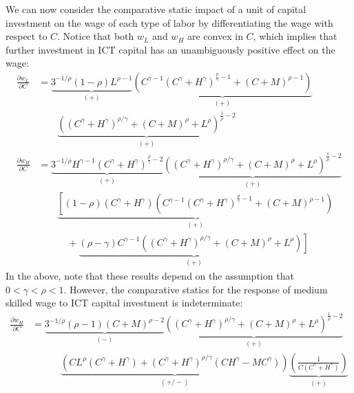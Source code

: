 \documentclass[a4paper]{article}
\begin{document}
We can now consider the comparative static impact of a unit of capital investment on the wage of each type of labor by differentiating the wage with respect to $C$. Notice that both $w_L$ and $w_H$ are convex in $C$, which implies that further investment in ICT capital has an unambiguously positive effect on the wage:
\begin{align*}
\frac{\partial w_L}{\partial C}
  &= \underbrace{3^{-1/\rho } \left(1 - \rho \right) L^{\rho -1}}_{(+)}
\underbrace{\left(C^{\gamma -1} \left(C^{\gamma }+H^{\gamma }\right)^{\frac{\rho }{\gamma }-1}+(C+M)^{\rho -1}\right)}_{(+)}\\
&\quad\quad \underbrace{\left(\left(C^{\gamma }+H^{\gamma }\right)^{\rho /\gamma }+(C+M)^{\rho }+L^{\rho }\right)^{\frac{1}{\rho }-2}}_{(+)} \\
% 
\frac{\partial w_H}{\partial C}
&= \underbrace{3^{-1/\rho } H^{\gamma -1} \left(C^{\gamma }+H^{\gamma }\right)^{\frac{\rho }{\gamma }-2}}_{(+)} 
\underbrace{\left(\left(C^{\gamma }+H^{\gamma }\right)^{\rho /\gamma }+(C+M)^{\rho }+L^{\rho }\right)^{\frac{1}{\rho }-2}}_{(+)} \\
&\quad\quad \underbrace{\left[\left(1-\rho \right) \left(C^{\gamma }+H^{\gamma }\right) \left(C^{\gamma -1} \left(C^{\gamma }+H^{\gamma }\right)^{\frac{\rho }{\gamma }-1}+(C+M)^{\rho -1}\right) \right.}_{(+)}\\
&\quad\quad\quad  + \underbrace{\left.(\rho - \gamma) C^{\gamma -1} \left(\left(C^{\gamma }+H^{\gamma }\right)^{\rho /\gamma }+(C+M)^{\rho }+L^{\rho }\right)\right]}_{(+)}
\end{align*}
In the above, note that these results depend on the assumption that $0 < \gamma < \rho < 1$. However, the comparative statics for the response of medium skilled wage to ICT capital investment is indeterminate:
\begin{align*}
  \frac{\partial w_H}{\partial C}
&= \underbrace{3^{-1/\rho } (\rho -1) (C+M)^{\rho -2}}_{(-)}
\underbrace{\left(\left(C^{\gamma }+H^{\gamma }\right)^{\rho /\gamma }+(C+M)^{\rho }+L^{\rho }\right)^{\frac{1}{\rho }-2}}_{(+)} \\
&\quad\quad\quad\underbrace{\left(C L^{\rho } \left(C^{\gamma }+H^{\gamma }\right)+\left(C^{\gamma }+H^{\gamma }\right)^{\rho /\gamma } \left(C H^{\gamma }-M C^{\gamma }\right)\right)}_{(+/-)}
\underbrace{\left(\frac{1}{C\left(C^{\gamma }+H^{\gamma }\right)}\right)}_{(+)}
\end{align*}
\end{document}
